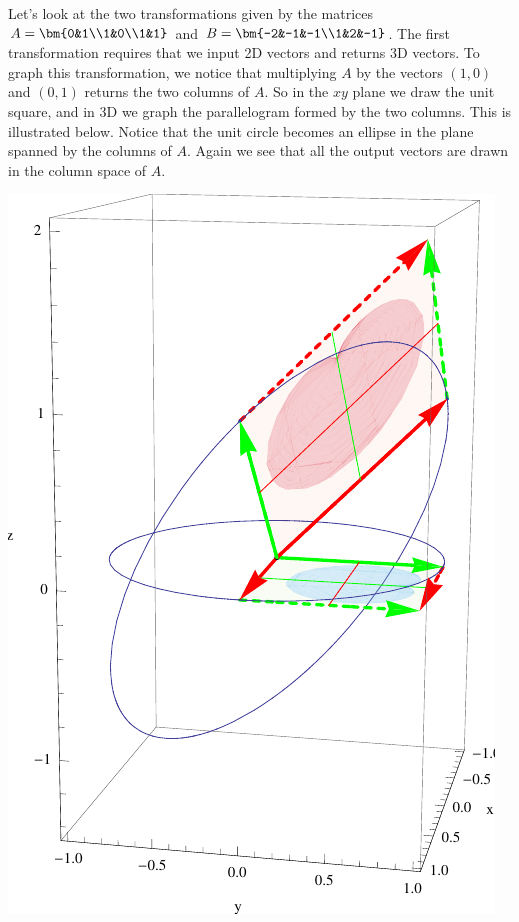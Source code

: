 \begin{example}
Let's look at the two transformations given by the matrices
$A=\bm{0&1\\1&0\\1&1}$ and 
$B=\bm{-2&-1&-1\\1&2&-1}$.
The first transformation requires that we input 2D vectors and returns 3D vectors. To graph this transformation, we notice that multiplying $A$ by the vectors $(1,0)$ and $(0,1)$ returns the two columns of $A$.  So in the $xy$ plane we draw the unit square, and in 3D we graph the parallelogram formed by the two columns.  This is illustrated below. Notice that the unit circle becomes an ellipse in the plane spanned by the columns of $A$.  Again we see that all the output vectors are drawn in the column space of $A$.
\begin{center}
\includegraphics[width=\marginparwidth]{Linear-Transformations/support/LT2dto3d}
\end{center}


\end{example}
